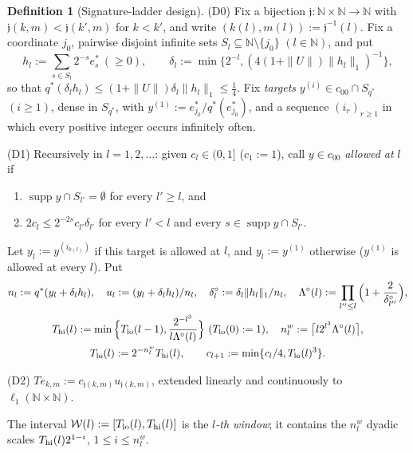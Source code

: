\documentclass[10pt]{amsart}
\theoremstyle{definition}
\newtheorem{definition}[theorem]{Definition}
\theoremstyle{remark}
\newcommand{\supp}{\operatorname{supp}}
\newcommand{\N}{\mathbb N}
\begin{document}
\begin{definition}[Signature-ladder design]\label{def:SLD}
\textup{(D0)} Fix a bijection $\mathfrak j:\N\times\N\to\N$ with
$\mathfrak j(k,m)<\mathfrak j(k',m)$ for $k<k'$, and write $(k(l),m(l)):=\mathfrak j^{-1}(l)$.
Fix a coordinate $j_0$, pairwise disjoint infinite sets
$S_l\subseteq\N\setminus\{j_0\}$ $(l\in\N)$, and put
\[
 h_l:=\sum_{s\in S_l}2^{-s}e_s^*\ (\ge0),\qquad \delta_l:=\min\big\{2^{-l},
 (4(1+\|U\|)\|h_l\|_1)^{-1}\big\},
\]
so that $q^*(\delta_lh_l)\le(1+\|U\|)\delta_l\|h_l\|_1\le\frac14$.  Fix
\emph{targets} $y^{(i)}\in c_{00}\cap S_{q^*}$ $(i\ge1)$, dense in
$S_{q^*}$, with $y^{(1)}:=e_{j_0}^*/q^*(e_{j_0}^*)$, and a sequence
$(i_r)_{r\ge1}$ in which every positive integer occurs infinitely often.

\textup{(D1)} Recursively in $l=1,2,\dots$: given $c_l\in(0,1]$ ($c_1:=1$),
call $y\in c_{00}$ \emph{allowed at} $l$ if
\begin{enumerate}
\item[(a)] $\supp y\cap S_{l'}=\emptyset$ for every $l'\ge l$, and
\item[(b)] $2c_l\le2^{-2s}c_{l'}\delta_{l'}$ for every $l'<l$ and every
$s\in\supp y\cap S_{l'}$.
\end{enumerate}
Let $y_l:=y^{(i_{k(l)})}$ if this target is allowed at $l$, and
$y_l:=y^{(1)}$ otherwise ($y^{(1)}$ is allowed at every $l$).  Put
\begin{gather*}
 n_l:=q^*(y_l+\delta_lh_l),\quad u_l:=(y_l+\delta_lh_l)/n_l,\quad
 \delta^\circ_l:=\delta_l\|h_l\|_1/n_l,\quad
 \Lambda^\circ(l):=\prod_{l''\le l}\Big(1+\frac2{\delta^\circ_{l''}}\Big),\\
 T_{\rm hi}(l):=\min\Big\{T_{\rm lo}(l-1),\frac{2^{-l^3}}{l\Lambda^\circ(l)}
 \Big\}\ (T_{\rm lo}(0):=1),\quad n^w_l:=\big\lceil l2^{l^3}\Lambda^\circ(l)
 \big\rceil,\\
 T_{\rm lo}(l):=2^{-n^w_l}T_{\rm hi}(l),\qquad
 c_{l+1}:=\min\{c_l/4,T_{\rm lo}(l)^3\}.
\end{gather*}

\textup{(D2)} $Te_{k,m}:=c_{\mathfrak j(k,m)}u_{\mathfrak j(k,m)}$, extended linearly and
continuously to $\ell_1(\N\times\N)$.
\end{definition}

The interval $\mathcal W(l):=[T_{\rm lo}(l),T_{\rm hi}(l)]$ is the
\emph{$l$-th window}; it contains the $n^w_l$ dyadic scales
$T_{\rm hi}(l)2^{1-i}$, $1\le i\le n^w_l$.
\end{document}
